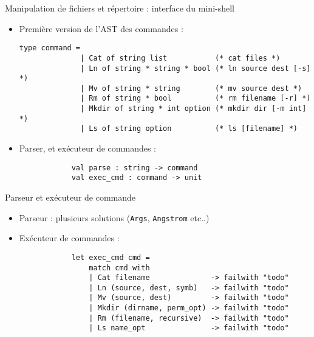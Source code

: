 \begin{frame}[fragile]{Manipulation de fichiers et répertoire : interface du mini-shell}
    \begin{itemize}[leftmargin=-12pt]
    \item<1->Première version de l'AST des commandes :
        \begin{lstlisting}[breaklines=false]
            type command =
              | Cat of string list           (* cat files *)  
              | Ln of string * string * bool (* ln source dest [-s] *)
              | Mv of string * string        (* mv source dest *)
              | Rm of string * bool          (* rm filename [-r] *)  
              | Mkdir of string * int option (* mkdir dir [-m int] *)
              | Ls of string option          (* ls [filename] *)  
        \end{lstlisting}
        
    \item<2-> Parser, et exécuteur de commandes :
         \begin{lstlisting}
            val parse : string -> command
            val exec_cmd : command -> unit 
        \end{lstlisting}
    \end{itemize}
\end{frame}  

\begin{frame}[fragile]{Parseur et exécuteur de commande}

    \begin{itemize}[label=\small{}]
    \item Parseur : plusieurs solutions (\texttt{Args}, \texttt{Angstrom} etc..)
    \item Exécuteur de commandes : 
      \begin{lstlisting}
            let exec_cmd cmd = 
                match cmd with
                | Cat filename              -> failwith "todo"
                | Ln (source, dest, symb)   -> failwith "todo"
                | Mv (source, dest)         -> failwith "todo"
                | Mkdir (dirname, perm_opt) -> failwith "todo"
                | Rm (filename, recursive)  -> failwith "todo"
                | Ls name_opt               -> failwith "todo"
        \end{lstlisting}
    \end{itemize}
\end{frame} 

